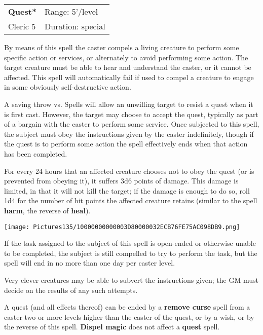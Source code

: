 \documentclass[a4paper,twoside,openany,10pt]{book}
\begin{document}
\begin{multicols}{2}
\smallskip\begin{flushleft} 
	\begin{tabularx}{0.45\textwidth}{@{}m{3.5cm}m{5.5cm}@{}} 
		\textbf{Quest*} & Range: 5'/level\\
Cleric 5 &Duration: special\\
	\end{tabularx}\end{flushleft}

By means of this spell the caster compels a living creature to perform some specific action or services, or alternately to avoid performing some action. The target creature must be able to hear and understand the caster, or it cannot be affected. This spell will automatically fail if used to compel a creature to engage in some obviously self-destructive action.

A saving throw vs. Spells will allow an unwilling target to resist a quest when it is first cast. However, the target may choose to accept the quest, typically as part of a bargain with the caster to perform some service. Once subjected to this spell, the subject must obey the instructions given by the caster indefinitely, though if the quest is to perform some action the spell effectively ends when that action has been completed.

For every 24 hours that an affected creature chooses not to obey the quest (or is prevented from obeying it), it suffers 3d6 points of damage. This damage is limited, in that it will not kill the target; if the damage is enough to do so, roll 1d4 for the number of hit points the affected creature retains (similar to the spell \textbf{harm}, the reverse of \textbf{heal}).


\begin{flushleft}
	\texttt{[image: Pictures135/10000000000003D80000032ECB76FE75AC098DB9.png]}
\end{flushleft}

If the task assigned to the subject of this spell is open-ended or otherwise unable to be completed, the subject is still compelled to try to perform the task, but the spell will end in no more than one day per caster level.

Very clever creatures may be able to subvert the instructions given; the GM must decide on the results of any such attempts.

A quest (and all effects thereof) can be ended by a \textbf{remove curse} spell from a caster two or more levels higher than the caster of the quest, or by a wish, or by the reverse of this spell. \textbf{Dispel magic} does not affect a \textbf{quest }spell.




\end{multicols}
\end{document}
